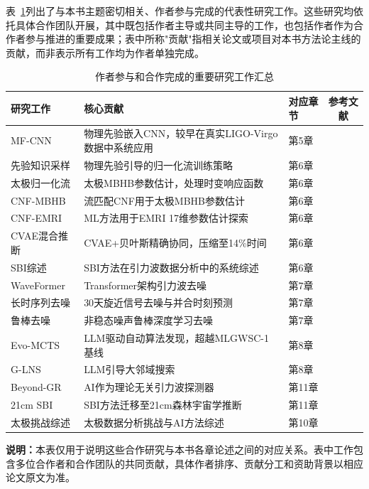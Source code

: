 表~\ref{tab:original_contributions}列出了与本书主题密切相关、作者参与完成的代表性研究工作。这些研究均依托具体合作团队开展，其中既包括作者主导或共同主导的工作，也包括作者作为合作者参与推进的重要成果；表中所称"贡献"指相关论文或项目对本书方法论主线的贡献，而非表示所有工作均为作者单独完成。

\begin{table}[htbp]
\centering
\caption{作者参与和合作完成的重要研究工作汇总}
\label{tab:original_contributions}
\small
\begin{tabular}{lllc}
\hline
\textbf{研究工作} & \textbf{核心贡献} & \textbf{对应章节} & \textbf{参考文献} \\
\hline
MF-CNN & 物理先验嵌入CNN，较早在真实LIGO-Virgo数据中系统应用 & 第5章 & \cite{wang2020deeplearning} \\
先验知识采样 & 物理先验引导的归一化流训练策略 & 第6章 & \cite{wang2022normflow} \\
太极归一化流 & 太极MBHB参数估计，处理时变响应函数 & 第6章 & \cite{du2024normflow} \\
CNF-MBHB & 流匹配CNF用于太极MBHB参数估计 & 第6章 & \cite{liang2024cnfmbhb} \\
CNF-EMRI & ML方法用于EMRI 17维参数估计探索 & 第6章 & \cite{liang2024cnfemri} \\
CVAE混合推断 & CVAE+贝叶斯精确协同，压缩至14\%时间 & 第6章 & \cite{sun2025cvae} \\
SBI综述 & SBI方法在引力波数据分析中的系统综述 & 第6章 & \cite{liang2026sbireview} \\
WaveFormer & Transformer架构引力波去噪 & 第7章 & \cite{wang2024waveformer} \\
长时序列去噪 & 30天旋近信号去噪与并合时刻预测 & 第7章 & \cite{xu2024denoising} \\
鲁棒去噪 & 非稳态噪声鲁棒深度学习去噪 & 第7章 & \cite{xu2024nonstationarty} \\
Evo-MCTS & LLM驱动自动算法发现，超越MLGWSC-1基线 & 第8章 & \cite{wang2025evomcts} \\
G-LNS & LLM引导大邻域搜索 & 第8章 & \cite{zhao2025glns} \\
Beyond-GR & AI作为理论无关引力波探测器 & 第11章 & \cite{wang2025beyondgr} \\
21cm SBI & SBI方法迁移至21cm森林宇宙学推断 & 第11章 & \cite{sun2025_21cm} \\
太极挑战综述 & 太极数据分析挑战与AI方法综述 & 第10章 & \cite{wang2024challenges} \\
\hline
\end{tabular}
\par\vspace{2mm}
\parbox{0.96\textwidth}{\textbf{说明：}本表仅用于说明这些合作研究与本书各章论述之间的对应关系。表中工作包含多位合作者和合作团队的共同贡献，具体作者排序、贡献分工和资助背景以相应论文原文为准。}
\end{table}

